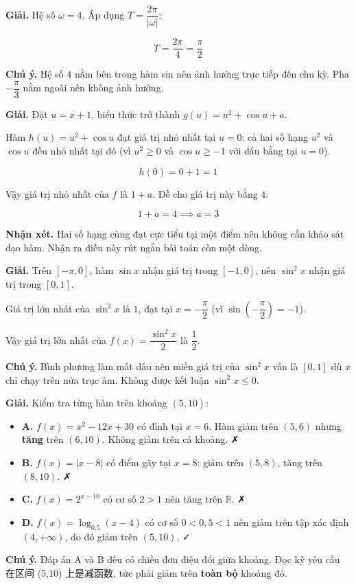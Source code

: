 \documentclass[11pt, a4paper]{article}
\begin{document}
\begin{dapan}[2 — Đáp án C]
\textbf{Giải.} Hệ số $\omega = 4$. Áp dụng $T = \dfrac{2\pi}{|\omega|}$:

$$T = \frac{2\pi}{4} = \frac{\pi}{2}$$

\textbf{Chú ý.} Hệ số $4$ nằm bên trong hàm sin nên ảnh hưởng trực tiếp đến chu kỳ. Pha $-\dfrac{\pi}{3}$ nằm ngoài nên không ảnh hưởng.
\end{dapan}

\begin{dapan}[3 — Đáp án A]
\textbf{Giải.} Đặt $u = x + 1$, biểu thức trở thành $g(u) = u^2 + \cos u + a$.

Hàm $h(u) = u^2 + \cos u$ đạt giá trị nhỏ nhất tại $u = 0$: cả hai số hạng $u^2$ và $\cos u$ đều nhỏ nhất tại đó (vì $u^2 \ge 0$ và $\cos u \ge -1$ với dấu bằng tại $u = 0$).

$$h(0) = 0 + 1 = 1$$

Vậy giá trị nhỏ nhất của $f$ là $1 + a$. Đề cho giá trị này bằng $4$:

$$1 + a = 4 \implies a = 3$$

\textbf{Nhận xét.} Hai số hạng cùng đạt cực tiểu tại một điểm nên không cần khảo sát đạo hàm. Nhận ra điều này rút ngắn bài toán còn một dòng.
\end{dapan}

\begin{dapan}[4 — Đáp án B]
\textbf{Giải.} Trên $[-\pi, 0]$, hàm $\sin x$ nhận giá trị trong $[-1, 0]$, nên $\sin^2 x$ nhận giá trị trong $[0, 1]$.

Giá trị lớn nhất của $\sin^2 x$ là $1$, đạt tại $x = -\dfrac{\pi}{2}$ (vì $\sin\left(-\dfrac{\pi}{2}\right) = -1$).

Vậy giá trị lớn nhất của $f(x) = \dfrac{\sin^2 x}{2}$ là $\dfrac{1}{2}$.

\textbf{Chú ý.} Bình phương làm mất dấu nên miền giá trị của $\sin^2 x$ vẫn là $[0,1]$ dù $x$ chỉ chạy trên nửa trục âm. Không được kết luận $\sin^2 x \le 0$.
\end{dapan}

\begin{dapan}[5 — Đáp án D]
\textbf{Giải.} Kiểm tra từng hàm trên khoảng $(5, 10)$:

\begin{itemize}[leftmargin=1.4em, itemsep=2pt]
\item \textbf{A.} $f(x) = x^2 - 12x + 30$ có đỉnh tại $x = 6$. Hàm giảm trên $(5,6)$ nhưng \textbf{tăng} trên $(6,10)$. Không giảm trên cả khoảng. ✗
\item \textbf{B.} $f(x) = |x-8|$ có điểm gãy tại $x = 8$: giảm trên $(5,8)$, tăng trên $(8,10)$. ✗
\item \textbf{C.} $f(x) = 2^{x-10}$ có cơ số $2 > 1$ nên tăng trên $\mathbb{R}$. ✗
\item \textbf{D.} $f(x) = \log_{0.5}(x-4)$ có cơ số $0 < 0{,}5 < 1$ nên giảm trên tập xác định $(4, +\infty)$, do đó giảm trên $(5,10)$. ✓
\end{itemize}


\textbf{Chú ý.} Đáp án A và B đều có chiều đơn điệu đổi giữa khoảng. Đọc kỹ yêu cầu 在区间 (5,10) 上是减函数, tức phải giảm trên \textbf{toàn bộ} khoảng đó.
\end{dapan}
\end{document}
